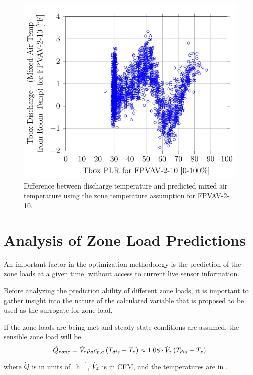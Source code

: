 \begin{figure}
\centering
\includegraphics[]{Plots/2017-01-10-0906-TboxDischargeMixedAirTempfromRoomTempforFPVAV210vsTboxPLRforFPVAV210.pdf}
\caption{Difference between discharge temperature and predicted mixed
air temperature using the zone temperature assumption for FPVAV-2-10.}
\label{fig:2017-01-10-0906-TboxDischargeMixedAirTempfromRoomTempforFPVAV210vsTboxPLRforFPVAV210}
\end{figure}




\section{Analysis of Zone Load Predictions}

An important factor in the optimization methodology is the prediction of
the zone loads at a given time, without access to current live sensor
information. 

Before analyzing the prediction ability of different zone loads, it is
important to gather insight into the nature of the calculated variable
that is proposed to be used as the surrogate for zone load.   

If the zone loads are being met and steady-state conditions are assumed,
the sensible zone load will be
\begin{equation}
    \dot{Q}_{zone}=\dot{V}_{z} \rho_a c_{p,a}{} \left(T_{dis}-T_{z} \right) \approx 1.08 \cdot \dot{V}_{z}\left(T_{dis}-T_{z} \right)
\end{equation}
where \(\dot{Q}\) is in units of \si{\btu\per\hour}, \(\dot{V}_{z}\) is in CFM, and the temperatures are in \si{\degreeF}.

